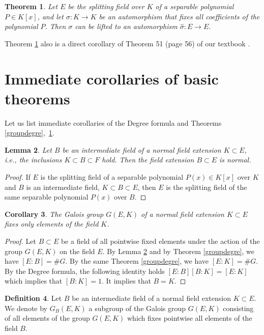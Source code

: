 \documentclass[11pt]{article}
\theoremstyle{plain}
\newtheorem{theorem}{Theorem}[section]
\newtheorem{lemma}[theorem]{Lemma}
\newtheorem{corollary}[theorem]{Corollary}
\theoremstyle{definition}
\newtheorem{definition}[theorem]{Definition}
\begin{document}
\begin{theorem} \label{lifting}Let  $E$ be the splitting field over $K$ of a separable polynomial $P\in K[x]$, and let $\sigma :K\to K$ be an automorphism that fixes all coefficients of the polynomial $P$. Then $\sigma$ can be lifted to an automorphism $\hat \sigma:E\to E$.
\end{theorem}

Theorem \ref{lifting} also is a direct corollary of Theorem 51 (page 56) of  our textbook \cite{Rotman}.

\section{Immediate corollaries of basic theorems}

Let us list immediate corollaries of the Degree formula and Theorems \ref{groupdegre},~\ref{lifting}.

\begin{lemma}\label{otherfield} Let $B$ be an intermediate field of a normal field extension $K\subset E$, i.e., the inclusions  $K\subset B\subset F$  hold.  Then  the field extension $B\subset E$ is normal.
 \end{lemma}

\begin{proof} If $E$ is the  splitting field of a separable polynomial $P(x)\in K[x]$ over $K$ and $B$ is an intermediate field, $K\subset B \subset E$, then $E$ is the splitting field of the same  separable polynomial $P(x)$ over $B$.
\end{proof}

\begin{corollary} The Galois group $G(E,K)$ of a normal field extension $K\subset E$
 fixes only elements of the field $K$.
\end{corollary}

\begin{proof} Let $B\subset E$ be a field of all pointwise  fixed elements under the action  of the group $G(E,K)$ on the field $E$. By Lemma \ref{otherfield}
and
by Theorem \ref{groupdegre},  we have $[E:B]=\#G$. By the same Theorem \ref{groupdegre}, we have $[E:K]=\#G$.
By the Degree formula, the following identity holds $[E:B] [B:K]=[E:K]$ which implies that $[B:K]=1$.  It implies  that $B=K$.
\end{proof}

\begin{definition} Let  $B$ be an  intermediate field of a normal field extension  $K\subset E$.
We denote by $G_B(E,K)$ a subgroup of the Galois group $G(E,K)$ consisting of all elements of the group $G(E,K)$ which fixes pointwise all elements  of the field $B$.
\end{definition}
\end{document}
